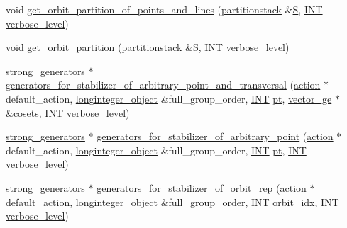 \begin{DoxyCompactItemize}
\item 
void \mbox{\hyperlink{classschreier_a21f20632d1ca65c28fb89d53e5cba55a}{get\+\_\+orbit\+\_\+partition\+\_\+of\+\_\+points\+\_\+and\+\_\+lines}} (\mbox{\hyperlink{classpartitionstack}{partitionstack}} \&\mbox{\hyperlink{simeon_8_c_adab47f8243f1b5a2c31df2535d6b37d0}{S}}, \mbox{\hyperlink{galois_8h_a09fddde158a3a20bd2dcadb609de11dc}{I\+NT}} \mbox{\hyperlink{simeon_8_c_a818073fbcc2f439e7c56952f67386122}{verbose\+\_\+level}})
\item 
void \mbox{\hyperlink{classschreier_a9d7ef5f2db9c8828ed80f33409810bc3}{get\+\_\+orbit\+\_\+partition}} (\mbox{\hyperlink{classpartitionstack}{partitionstack}} \&\mbox{\hyperlink{simeon_8_c_adab47f8243f1b5a2c31df2535d6b37d0}{S}}, \mbox{\hyperlink{galois_8h_a09fddde158a3a20bd2dcadb609de11dc}{I\+NT}} \mbox{\hyperlink{simeon_8_c_a818073fbcc2f439e7c56952f67386122}{verbose\+\_\+level}})
\item 
\mbox{\hyperlink{classstrong__generators}{strong\+\_\+generators}} $\ast$ \mbox{\hyperlink{classschreier_a63e4acebeefabb5a5dd6f4c2a60398f5}{generators\+\_\+for\+\_\+stabilizer\+\_\+of\+\_\+arbitrary\+\_\+point\+\_\+and\+\_\+transversal}} (\mbox{\hyperlink{classaction}{action}} $\ast$default\+\_\+action, \mbox{\hyperlink{classlonginteger__object}{longinteger\+\_\+object}} \&full\+\_\+group\+\_\+order, \mbox{\hyperlink{galois_8h_a09fddde158a3a20bd2dcadb609de11dc}{I\+NT}} \mbox{\hyperlink{clique__finder_8_c_aec1f1a2b30fdca8844c2932384483145}{pt}}, \mbox{\hyperlink{classvector__ge}{vector\+\_\+ge}} $\ast$\&cosets, \mbox{\hyperlink{galois_8h_a09fddde158a3a20bd2dcadb609de11dc}{I\+NT}} \mbox{\hyperlink{simeon_8_c_a818073fbcc2f439e7c56952f67386122}{verbose\+\_\+level}})
\item 
\mbox{\hyperlink{classstrong__generators}{strong\+\_\+generators}} $\ast$ \mbox{\hyperlink{classschreier_aa6cc932d095c7acfbc2f764828fde3f8}{generators\+\_\+for\+\_\+stabilizer\+\_\+of\+\_\+arbitrary\+\_\+point}} (\mbox{\hyperlink{classaction}{action}} $\ast$default\+\_\+action, \mbox{\hyperlink{classlonginteger__object}{longinteger\+\_\+object}} \&full\+\_\+group\+\_\+order, \mbox{\hyperlink{galois_8h_a09fddde158a3a20bd2dcadb609de11dc}{I\+NT}} \mbox{\hyperlink{clique__finder_8_c_aec1f1a2b30fdca8844c2932384483145}{pt}}, \mbox{\hyperlink{galois_8h_a09fddde158a3a20bd2dcadb609de11dc}{I\+NT}} \mbox{\hyperlink{simeon_8_c_a818073fbcc2f439e7c56952f67386122}{verbose\+\_\+level}})
\item 
\mbox{\hyperlink{classstrong__generators}{strong\+\_\+generators}} $\ast$ \mbox{\hyperlink{classschreier_afd6fcc50900894e183d838f09e840da6}{generators\+\_\+for\+\_\+stabilizer\+\_\+of\+\_\+orbit\+\_\+rep}} (\mbox{\hyperlink{classaction}{action}} $\ast$default\+\_\+action, \mbox{\hyperlink{classlonginteger__object}{longinteger\+\_\+object}} \&full\+\_\+group\+\_\+order, \mbox{\hyperlink{galois_8h_a09fddde158a3a20bd2dcadb609de11dc}{I\+NT}} orbit\+\_\+idx, \mbox{\hyperlink{galois_8h_a09fddde158a3a20bd2dcadb609de11dc}{I\+NT}} \mbox{\hyperlink{simeon_8_c_a818073fbcc2f439e7c56952f67386122}{verbose\+\_\+level}})

\end{DoxyCompactItemize}

